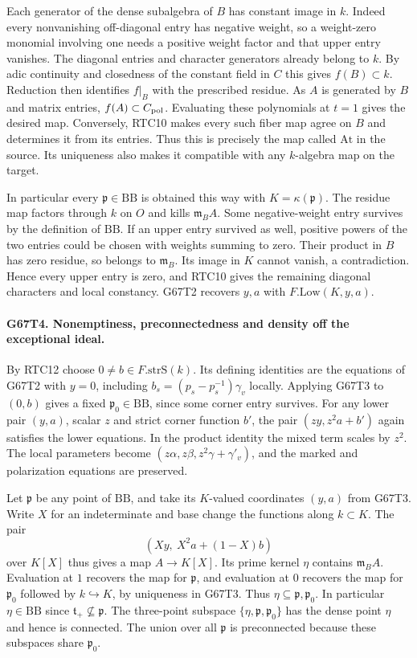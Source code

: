 Each generator of the dense subalgebra of $B$ has constant image
in $k$. Indeed every nonvanishing off-diagonal entry has negative
weight, so a weight-zero monomial involving one needs a positive
weight factor and that upper entry vanishes. The diagonal entries
and character generators already belong to $k$. By adic continuity
and closedness of the constant field in $C$ this gives $f(B)\subset k$.
Reduction then identifies $f|_B$ with the prescribed residue.
As $A$ is generated by $B$ and matrix entries, $f(A)\subset C_{\rm pol}$.
Evaluating these polynomials at $t=1$ gives the desired map.
Conversely, RTC10 makes every such fiber map agree on $B$ and
determines it from its entries. Thus this is precisely the map
called $\mathrm{At}$ in the source. Its uniqueness also makes it
compatible with any $k$-algebra map on the target.

In particular every $\mathfrak p\in\mathrm{BB}$ is obtained this
way with $K=\kappa(\mathfrak p)$. The residue map factors through
$k$ on $O$ and kills $\mathfrak m_B A$. Some negative-weight
entry survives by the definition of $\mathrm{BB}$. If an upper
entry survived as well, positive powers of the two entries could
be chosen with weights summing to zero. Their product in $B$
has zero residue, so belongs to $\mathfrak m_B$. Its image in $K$
cannot vanish, a contradiction. Hence every upper entry is zero,
and RTC10 gives the remaining diagonal characters and local constancy.
G67T2 recovers $y,a$ with $F.\mathrm{Low}(K,y,a)$.

\paragraph{G67T4. Nonemptiness, preconnectedness and density off the exceptional ideal.}
By RTC12 choose $0\ne b\in F.\mathrm{strS}(k)$. Its defining
identities are the equations of G67T2 with $y=0$, including
$b_s=(p_s-p_s^{-1})\gamma_v$ locally. Applying G67T3 to $(0,b)$
gives a fixed $\mathfrak p_0\in\mathrm{BB}$, since some corner
entry survives. For any lower pair $(y,a)$, scalar $z$ and strict
corner function $b'$, the pair $(z y,z^2 a+b')$ again satisfies
the lower equations. In the product identity the mixed term scales
by $z^2$. The local parameters become
$(z\alpha,z\beta,z^2\gamma+\gamma'_v)$, and the marked and
polarization equations are preserved.

Let $\mathfrak p$ be any point of $\mathrm{BB}$, and take its
$K$-valued coordinates $(y,a)$ from G67T3. Write $X$ for an
indeterminate and base change the functions along $k\subset K$.
The pair
\[
              (X y,\ X^2a+(1-X)b)
\]
over $K[X]$ thus gives a map $A\to K[X]$. Its prime kernel
$\eta$ contains $\mathfrak m_B A$. Evaluation at $1$ recovers
the map for $\mathfrak p$, and evaluation at $0$ recovers the
map for $\mathfrak p_0$ followed by $k\hookrightarrow K$, by
uniqueness in G67T3. Thus $\eta\subseteq\mathfrak p,\mathfrak p_0$.
In particular $\eta\in\mathrm{BB}$ since
$\mathfrak t_+\not\subseteq\mathfrak p$. The three-point subspace
$\{\eta,\mathfrak p,\mathfrak p_0\}$ has the dense point $\eta$
and hence is connected. The union over all $\mathfrak p$ is
preconnected because these subspaces share $\mathfrak p_0$.

